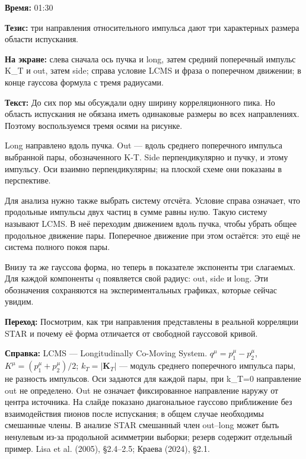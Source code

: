 \textbf{Время:} 01:30

\textbf{Тезис:} три направления относительного импульса дают три характерных размера области испускания.

\textbf{На экране:} слева сначала ось пучка и long, затем средний поперечный импульс K\_T и out, затем side; справа условие LCMS и фраза о поперечном движении; в конце гауссова формула с тремя радиусами.

\textbf{Текст:} До сих пор мы обсуждали одну ширину корреляционного пика. Но область испускания не обязана иметь одинаковые размеры во всех направлениях. Поэтому воспользуемся тремя осями на рисунке.

Long направлено вдоль пучка. Out — вдоль среднего поперечного импульса выбранной пары, обозначенного K-T. Side перпендикулярно и пучку, и этому импульсу. Оси взаимно перпендикулярны; на плоской схеме они показаны в перспективе.

Для анализа нужно также выбрать систему отсчёта. Условие справа означает, что продольные импульсы двух частиц в сумме равны нулю. Такую систему называют LCMS. В неё переходим движением вдоль пучка, чтобы убрать общее продольное движение пары. Поперечное движение при этом остаётся: это ещё не система полного покоя пары.

Внизу та же гауссова форма, но теперь в показателе экспоненты три слагаемых. Для каждой компоненты q появляется свой радиус: out, side и long. Эти обозначения сохраняются на экспериментальных графиках, которые сейчас увидим.

\textbf{Переход:} Посмотрим, как три направления представлены в реальной корреляции STAR и почему её форма отличается от свободной гауссовой кривой.

\textbf{Справка:} LCMS — Longitudinally Co-Moving System. \(q^\mu=p_1^\mu-p_2^\mu\), \(K^\mu=(p_1^\mu+p_2^\mu)/2\); \(k_T=|\mathbf K_T|\) — модуль среднего поперечного импульса пары, не разность импульсов. Оси задаются для каждой пары, при k\_T=0 направление out не определено. Out не означает фиксированное направление наружу от центра источника. На слайде показано диагональное гауссово приближение без взаимодействия пионов после испускания; в общем случае необходимы смешанные члены. В анализе STAR смешанный член out–long может быть ненулевым из-за продольной асимметрии выборки; резерв содержит отдельный пример. Lisa et al. (2005), §2.4–2.5; Краева (2024), §2.1.
